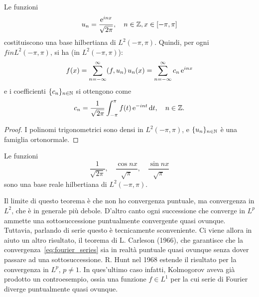 \begin{theorem}
\label{th:hilb_thirteen}
	Le funzioni
	\begin{equation*}
		u_n = \frac{\mathrm{e}^{inx}}{\sqrt{2\pi}}, \quad n \in \mathbb{Z}, x \in [-\pi,\pi]
	\end{equation*}
	costituiscono una base hilbertiana di $L^2(-\pi, \pi)$. Quindi, per ogni $f in L^2(-\pi,\pi)$, si ha (in $L^2(-\pi,\pi)$):
	\begin{equation}
	\label{eq:fourier_series}
		f(x) = \sum_{n=-\infty}^\infty (f,u_n)\,u_n(x) = \sum_{n=-\infty}^\infty c_n\,\mathrm{e}^{inx}
	\end{equation}
	e i coefficienti $\{c_n\}_{n \in \mathbb{N}}$ si ottengono come
	\begin{equation*}
		c_n = \frac1{\sqrt{2\pi}} \int_{-\pi}^\pi f(t) \,\mathrm{e}^{-int}\,\mathrm{d}t, \quad n \in \mathbb{Z}.
	\end{equation*}
\end{theorem}
\begin{proof}
	I polinomi trigonometrici sono densi in $L^2(-\pi,\pi)$, e $\{u_n\}_{n \in \mathbb{N}}$ è una famiglia ortonormale.
\end{proof}

\begin{remark}
	Le funzioni
	\begin{equation*}
		\frac1{\sqrt{2\pi}}, \quad \frac{\cos nx}{\sqrt{\pi}}, \quad \frac{\sin nx}{\sqrt{\pi}}
	\end{equation*}
	sono una base reale hilbertiana di $L^2(-\pi,\pi)$.
\end{remark}

Il limite di questo teorema è che non ho convergenza puntuale, ma convergenza in $L^2$, che è in generale più debole.
D'altro canto ogni successione che converge in $L^p$ ammette una sottosuccessione puntualmente convergente quasi ovunque.
Tuttavia, parlando di serie questo è tecnicamente sconveniente. Ci viene allora in aiuto un altro risultato, il teorema di L. Carleson (1966), che garantisce che la convergenza~\eqref{eq:fourier_series} sia in realtà puntuale quasi ovunque senza dover passare ad una sottosuccessione.
R. Hunt nel 1968 estende il risultato per la convergenza in $L^p$, $p \neq 1$. In ques'ultimo caso infatti, Kolmogorov aveva già prodotto un controesempio, ossia una funzione $f \in L^1$ per la cui serie di Fourier diverge puntualmente quasi ovunque.
